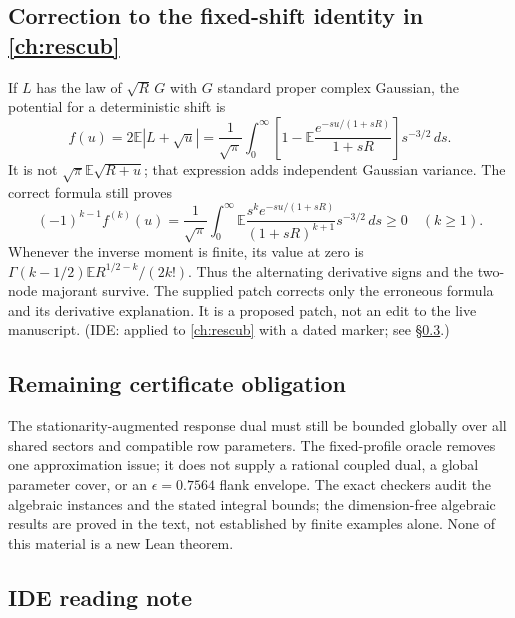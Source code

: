 \subsection{Correction to the fixed-shift identity in \autoref{ch:rescub}}
If $L$ has the law of $\sqrt R\,G$ with $G$ standard proper complex Gaussian,
the potential for a deterministic shift is
\[
 f(u)=2\mathbb E|L+\sqrt u|
 =\frac1{\sqrt\pi}\int_0^\infty
 \left[1-\mathbb E\frac{e^{-su/(1+sR)}}{1+sR}\right]s^{-3/2}\,ds.
\]
It is not $\sqrt\pi\mathbb E\sqrt{R+u}$; that expression adds independent
Gaussian variance. The correct formula still proves
\[
 (-1)^{k-1}f^{(k)}(u)
 =\frac1{\sqrt\pi}\int_0^\infty
 \mathbb E\frac{s^k e^{-su/(1+sR)}}{(1+sR)^{k+1}}s^{-3/2}\,ds\ge0
 \quad(k\ge1).
\]
Whenever the inverse moment is finite, its value at zero is
$\Gamma(k-1/2)\mathbb E R^{1/2-k}/(2k!)$.
Thus the alternating derivative signs and the two-node majorant survive.
The supplied patch corrects only the erroneous formula and its derivative
explanation. It is a proposed patch, not an edit to the live manuscript.
(IDE: applied to \autoref{ch:rescub} with a dated marker; see \S\ref{sec:weakk-reading}.)

\subsection{Remaining certificate obligation}\label{sec:weakk-remaining}
The stationarity-augmented response dual must still be bounded globally over
all shared sectors and compatible row parameters. The fixed-profile oracle
removes one approximation issue; it does not supply a rational coupled dual,
a global parameter cover, or an $\epsilon=0.7564$ flank envelope. The exact
checkers audit the algebraic instances and the stated integral bounds; the
dimension-free algebraic results are proved in the text, not established by
finite examples alone. None of this material is a new Lean theorem.

\subsection{IDE reading note}\label{sec:weakk-reading}
